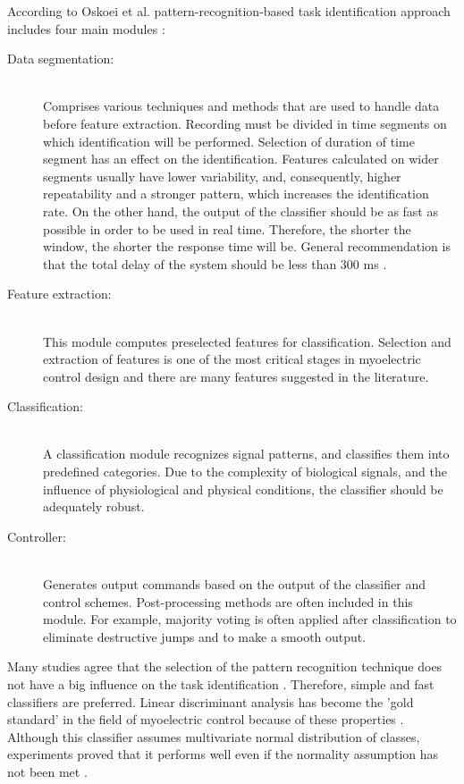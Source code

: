 According to Oskoei et al. pattern-recognition-based task identification approach includes four main modules \citep{Oskoei2007}:
\begin{description}
\item[Data segmentation:] \hfill \\
Comprises various techniques and methods that are used to handle data before feature extraction. Recording must be divided in time segments on which identification will be performed. Selection of duration of time segment has an effect on the identification. Features calculated on wider segments usually have lower variability, and, consequently, higher repeatability and a stronger pattern, which increases the identification rate. On the other hand, the output of the classifier should be as fast as possible in order to be used in real time.  Therefore, the shorter the window, the shorter the response time will be. General recommendation is that the total delay of the system should be less than 300 ms \citep{Oskoei2007, Englehart2003}. 

\item[Feature extraction:] \hfill \\
This module computes preselected features for classification. Selection and extraction of features is one of the most critical stages in myoelectric control design and there are many features suggested in the literature. 

\item[Classification:] \hfill \\
A classification module recognizes signal patterns, and classifies them into predefined categories. Due to the complexity of biological signals, and the influence of physiological and physical conditions, the classifier should be adequately robust.

\item[Controller:] \hfill \\Generates output commands based on the output of the classifier and control schemes. Post-processing methods are often included in this module. For example, majority voting is often applied after classification to eliminate destructive jumps and to make a smooth output.
\end{description}

Many studies agree that the selection of the pattern recognition technique does not have a big influence on the task identification \citep{Hakonen2015}. Therefore, simple and fast classifiers are preferred. Linear discriminant analysis has become the 'gold standard' in the field of myoelectric control because of these properties \citep{Tkach2010, Li2014, Hakonen2015}. Although this classifier assumes multivariate normal distribution of classes, experiments proved that it performs well even if the normality assumption has not been met \citep{Grouven1996}.

